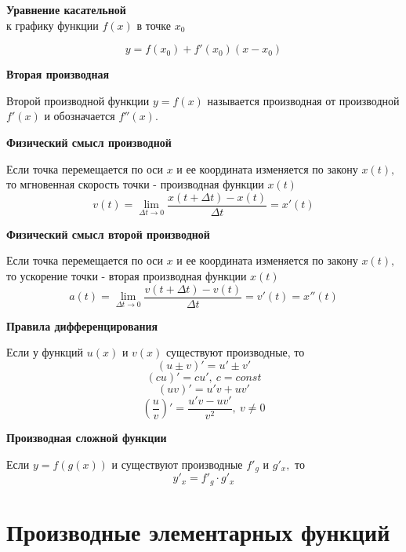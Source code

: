 \documentclass[a5paper, 8pt]{extarticle}
\begin{document}
\begin{center}
\textbf{Уравнение касательной}\\
к графику функции $f(x)$ в точке $x_0$
\end{center}
$$y=f(x_0)+f'(x_0)(x-x_0)$$

\begin{center}
\textbf{Вторая производная}
\end{center}

Второй производной функции $y=f(x)$ называется производная от производной $f'(x)$  и обозначается $f''(x).$

\begin{center}
\textbf{Физический смысл производной}
\end{center}
Если точка перемещается по оси $x$ и ее координата изменяется по закону $x(t),$ то мгновенная скорость точки - производная функции $x(t)$ 
$$
v(t)=\lim\limits_{\Delta t\to 0}\frac{x(t+\Delta t)-x(t)}{\Delta t}=x'(t)
$$

\begin{center}
\textbf{Физический смысл второй производной}
\end{center}
Если точка перемещается по оси $x$ и ее координата изменяется по закону $x(t),$ то ускорение точки - вторая производная функции $x(t)$ 
$$
a(t)=\lim\limits_{\Delta t\to 0}\frac{v(t+\Delta t)-v(t)}{\Delta t}=v'(t)=x''(t)
$$

\begin{center}
\textbf{Правила дифференцирования}
\end{center}

Если у функций $u(x)$ и $v(x)$ существуют производные, то
$$
(u\pm v)'=u'\pm v'
$$
$$
(cu)'=cu', \ c=const
$$
$$
(uv)'=u'v+uv'
$$
$$
\left(\frac{u}{v}\right)'=\frac{u'v-uv'}{v^2},\ v\not= 0
$$

\begin{center}
\textbf{Производная сложной функции}
\end{center}

Если $y=f(g(x))$ и существуют производные $f'_g$ и $g'_x,$ то
$$y'_x=f'_g\cdot g'_x$$

\section{Производные элементарных функций}
\end{document}
